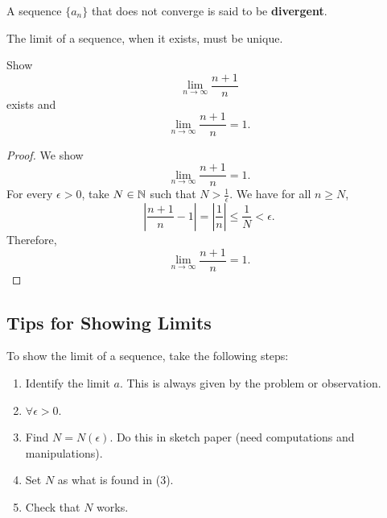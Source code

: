 \begin{definition}
  A sequence $\{a_n\}$ that does not converge is said
  to be \textbf{divergent}.
\end{definition}

\begin{theorem}
  The limit of a sequence, when it exists, must be
  unique.
\end{theorem}

\begin{exercise}
  Show
  \[\lim_{n \to \infty} \frac{n+1}{n}\]
  exists and
  \[\lim_{n \to \infty} \frac{n+1}{n} = 1.\]
\end{exercise}

\begin{proof}
  We show
  \[\lim_{n \to \infty} \frac{n+1}{n} = 1.\]
  For every $\epsilon > 0$, take $N \in \mathbb{N}$ such that
  $N > \frac{1}{\epsilon}$. We have for all $n \ge N$,
  \[
  \left|\frac{n+1}{n} - 1\right| = \left|\frac{1}{n}\right| \le \frac{1}{N} < \epsilon
  .\]
  Therefore,
  \[
    \lim_{n \to \infty} \frac{n+1}{n} = 1
  .\]
\end{proof}

\subsection{Tips for Showing Limits}
To show the limit of a sequence, take the following steps:
\begin{enumerate}
  \item Identify the limit $a$. This is always given
    by the problem or observation.
  \item $\forall \epsilon > 0$.
  \item Find $N = N(\epsilon)$. Do this in sketch paper
    (need computations and manipulations).
  \item Set $N$ as what is found in (3).
  \item Check that $N$ works.
\end{enumerate}
